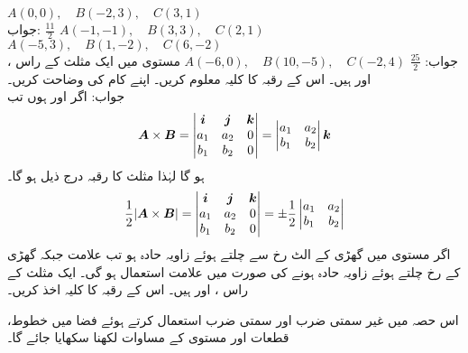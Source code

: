 $A(0,0),\quad B(-2,3),\quad C(3,1)$\\
جواب:\quad
$\tfrac{11}{2}$
$A(-1,-1),\quad B(3,3),\quad C(2,1)$
$A(-5,3),\quad B(1,-2),\quad C(6,-2)$\\
جواب:\quad
$\tfrac{25}{2}$
$A(-6,0),\quad B(10,-5),\quad C(-2,4)$
مستوی  میں ایک مثلث کے راس ،  اور  ہیں۔ اس کے رقبہ کا کلیہ معلوم کریں۔ اپنے کام کی وضاحت کریں۔\\
جواب:\quad
اگر  اور  ہوں تب
\begin{align*}
{\ensuremath{{\boldsymbol{A}}}}\times{\ensuremath{{\boldsymbol{B}}}}=\begin{vmatrix} {\boldsymbol{i}}&{\boldsymbol{j}}&{\boldsymbol{k}}\\ a_1&a_2&0\\b_1&b_2&0 \end{vmatrix}=
\begin{vmatrix}a_1&a_2\\b_1&b_2 \end{vmatrix}{\boldsymbol{k}}
\end{align*}
ہو گا لہٰذا مثلث کا رقبہ درج ذیل ہو گا۔
 \begin{align*}
\frac{1}{2}\abs{{{\boldsymbol{A}}}\times{\ensuremath{{\boldsymbol{B}}}}}=\begin{vmatrix} {\boldsymbol{i}}&{\boldsymbol{j}}&{\boldsymbol{k}}\\ a_1&a_2&0\\b_1&b_2&0 \end{vmatrix}=
\pm \frac{1}{2}\begin{vmatrix}a_1&a_2\\b_1&b_2 \end{vmatrix}
\end{align*}
اگر مستوی میں گھڑی کے الٹ رخ  سے  چلتے ہوئے  زاویہ حادہ  ہو تب  علامت جبکہ گھڑی کے رخ چلتے ہوئے زاویہ حادہ ہونے کی صورت میں  علامت استعمال ہو گی۔
ایک مثلث کے راس ،  اور  ہیں۔ اس کے رقبہ کا کلیہ اخذ کریں۔ 

اس حصہ میں غیر سمتی ضرب اور سمتی ضرب استعمال کرتے ہوئے فضا میں خطوط، قطعات اور مستوی کے مساوات لکھنا سکھایا جائے گا۔

